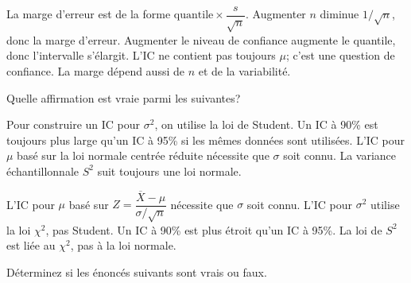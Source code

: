 \begin{questions}
\begin{solution}
La marge d'erreur est de la forme $\text{quantile}\times \dfrac{s}{\sqrt{n}}$. Augmenter $n$ diminue $1/\sqrt{n}$, donc la marge d'erreur. Augmenter le niveau de confiance augmente le quantile, donc l'intervalle s'élargit. L'IC ne contient pas toujours $\mu$; c'est une question de confiance. La marge dépend aussi de $n$ et de la variabilité.
\end{solution}

\vspace{0.5cm}
\question[3] Quelle affirmation est vraie parmi les suivantes?

\begin{checkboxes}
    \choice Pour construire un IC pour $\sigma^2$, on utilise la loi de Student.
    \choice Un IC à 90\% est toujours plus large qu'un IC à 95\% si les mêmes données sont utilisées.
    \correctchoice L'IC pour $\mu$ basé sur la loi normale centrée réduite nécessite que $\sigma$ soit connu.
    \choice La variance échantillonnale $S^2$ suit toujours une loi normale.
\end{checkboxes}

\begin{solution}
L'IC pour $\mu$ basé sur $Z=\dfrac{\overline{X}-\mu}{\sigma/\sqrt{n}}$ nécessite que $\sigma$ soit connu. L'IC pour $\sigma^2$ utilise la loi $\chi^2$, pas Student. Un IC à 90\% est plus étroit qu'un IC à 95\%. La loi de $S^2$ est liée au $\chi^2$, pas à la loi normale.
\end{solution}

\pageblanche
\question Déterminez si les énoncés suivants sont vrais ou faux.

\end{questions}

